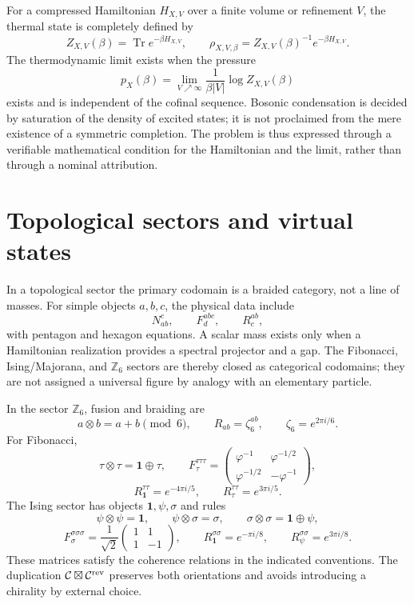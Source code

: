 For a compressed Hamiltonian \(H_{X,V}\) over a finite volume or refinement
\(V\), the thermal state is completely defined by
\[
 Z_{X,V}(\beta)=\operatorname{Tr}e^{-\beta H_{X,V}},
 \qquad
 \rho_{X,V,\beta}=Z_{X,V}(\beta)^{-1}e^{-\beta H_{X,V}}.
\]
The thermodynamic limit exists when the pressure
\[
 p_X(\beta)=\lim_{V\nearrow\infty}
 \frac1{\beta |V|}\log Z_{X,V}(\beta)
\]
exists and is independent of the cofinal sequence. Bosonic condensation is decided by saturation of the density of excited states; it is not proclaimed from the mere existence of a symmetric completion. The problem is thus expressed through a verifiable mathematical condition for the Hamiltonian and the limit, rather than through a nominal attribution.

\section{Topological sectors and virtual states}

In a topological sector the primary codomain is a braided category, not
a line of masses. For simple objects \(a,b,c\), the physical data include
\[
 N_{ab}^{c},\qquad F^{abc}_{d},\qquad R^{ab}_{c},
\]
with pentagon and hexagon equations. A scalar mass exists only
when a Hamiltonian realization provides a spectral projector and a
gap. The Fibonacci, Ising/Majorana, and \(\mathbb Z_6\) sectors are thereby
closed as categorical codomains; they are not assigned a universal figure
by analogy with an elementary particle.

In the sector \(\mathbb Z_6\), fusion and braiding are
\[
 a\otimes b=a+b\pmod 6,
 \qquad
 R_{ab}=\zeta_6^{ab},
 \qquad \zeta_6=e^{2\pi i/6}.
\]
For Fibonacci,
\[
 \tau\otimes\tau=\mathbf 1\oplus\tau,
 \qquad
 F_\tau^{\tau\tau\tau}=
 \begin{pmatrix}
 \varphi^{-1}&\varphi^{-1/2}\\
 \varphi^{-1/2}&-\varphi^{-1}
 \end{pmatrix},
\]
\[
 R_{\mathbf1}^{\tau\tau}=e^{-4\pi i/5},
 \qquad
 R_\tau^{\tau\tau}=e^{3\pi i/5}.
\]
The Ising sector has objects \(\mathbf1,\psi,\sigma\) and rules
\[
 \psi\otimes\psi=\mathbf1,
 \qquad
 \psi\otimes\sigma=\sigma,
 \qquad
 \sigma\otimes\sigma=\mathbf1\oplus\psi,
\]
\[
 F_\sigma^{\sigma\sigma\sigma}
 =\frac1{\sqrt2}
 \begin{pmatrix}1&1\\1&-1\end{pmatrix},
 \qquad
 R_{\mathbf1}^{\sigma\sigma}=e^{-\pi i/8},
 \qquad
 R_\psi^{\sigma\sigma}=e^{3\pi i/8}.
\]
These matrices satisfy the coherence relations in the indicated
conventions. The duplication
\(\mathcal C\boxtimes\mathcal C^{\rm rev}\) preserves both orientations and
avoids introducing a chirality by external choice.


